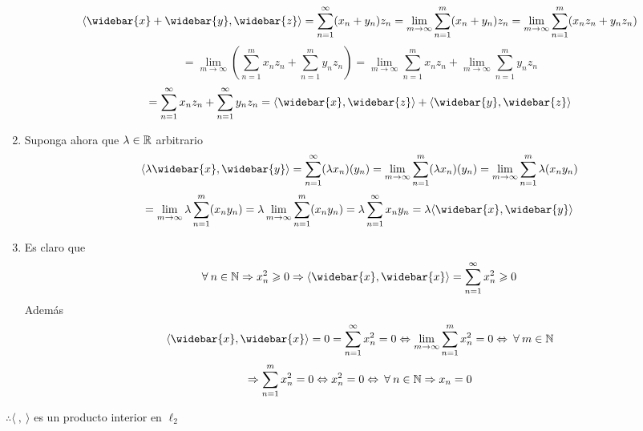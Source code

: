 \begin{proofexplanation}
\begin{enumerate}
        \begin{equation*}
            \langle \widebar{x} + \widebar{y}, \widebar{z} \rangle = \sum\limits_{n=1}^{\infty} ({x}_{n} + {y}_{n}){z}_{n} = \lim\limits_{m \to \infty} \sum\limits_{n=1}^{m} ({x}_{n} + {y}_{n}){z}_{n} = \lim\limits_{m \to \infty} \sum\limits_{n=1}^{m}({x}_{n}{z}_{n} + {y}_{n}{z}_{n}) 
        \end{equation*}
        \begin{equation*}
            = \lim\limits_{m \to \infty} \left( \sum\limits_{n=1}^{m}{x}_{n}{z}_{n}+ \sum\limits_{n=1}^{m} {y}_{n}{z}_{n} \right) = \lim\limits_{m \to \infty}\sum\limits_{n=1}^{m}{x}_{n}{z}_{n} + \lim\limits_{m \to \infty} \sum\limits_{n=1}^{m} {y}_{n}{z}_{n}
        \end{equation*}
        \begin{equation*}
             = \sum\limits_{n=1}^{\infty}{x}_{n}{z}_{n} + \sum\limits_{n=1}^{\infty}{y}_{n}{z}_{n} = \langle \widebar{x}, \widebar{z} \rangle + \langle \widebar{y}, \widebar{z} \rangle
        \end{equation*}
        \item Suponga ahora que $\lambda \in \mathbb{R}$ arbitrario
        \begin{equation*}
            \langle \lambda \widebar{x}, \widebar{y}  \rangle = \sum\limits_{n=1}^{\infty}(\lambda {x}_{n})({y}_{n}) = \lim\limits_{m \to \infty} \sum\limits_{n=1}^{m} (\lambda {x}_{n})({y}_{n}) = \lim\limits_{m \to \infty} \sum\limits_{n=1}^{m} \lambda ({x}_{n}{y}_{n})
        \end{equation*}
        \begin{equation*}
            = \lim\limits_{m \to \infty} \lambda  \sum\limits_{n=1}^{m} ({x}_{n}{y}_{n}) =\lambda   \lim\limits_{m \to \infty}  \sum\limits_{n=1}^{m} ({x}_{n}{y}_{n}) = \lambda \sum\limits_{n=1}^{\infty}{x}_{n}{y}_{n} = \lambda \langle  \widebar{x}, \widebar{y}  \rangle 
        \end{equation*}
        \item Es claro que 
        \begin{equation*}
            \forall \: n \in \N \Rightarrow {x}^{2}_{n} \geqslant 0 \Rightarrow \langle  \widebar{x}, \widebar{x}  \rangle = \sum\limits_{n=1}^{\infty}{x}^{2}_{n} \geqslant 0
        \end{equation*}
        Además
        \begin{equation*}
            \langle  \widebar{x}, \widebar{x}  \rangle = 0 =  \sum\limits_{n=1}^{\infty}{x}^{2}_{n} = 0 \iff \lim\limits_{m \to \infty} \sum\limits_{n=1}^{m} {x}^{2}_{n} = 0 \iff \: \forall \: m \in \N 
        \end{equation*}
        \begin{equation*}
            \Rightarrow \sum\limits_{n=1}^{m} {x}^{2}_{n} = 0 \Leftrightarrow {x}^{2}_{n} = 0 \Leftrightarrow \: \forall \: n \in \mathbb{N} \Rightarrow x_n = 0
        \end{equation*}
    \end{enumerate}
    $\therefore \langle \: , \: \rangle$ es un producto interior en $\ell_2$
\end{proofexplanation}

